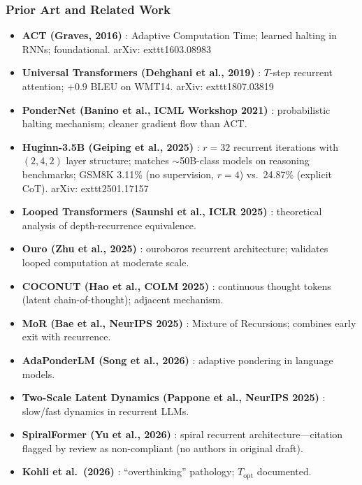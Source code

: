 \documentclass[11pt]{article}
\begin{document}
\subsubsection*{Prior Art and Related Work}
\begin{itemize}
  \item \textbf{ACT (Graves, 2016)} \cite{Graves2016}: Adaptive Computation Time; learned halting in RNNs; foundational.
    arXiv:	exttt{1603.08983}

  \item \textbf{Universal Transformers (Dehghani et al., 2019)} \cite{DehghaniEtAl2019}: $T$-step recurrent attention; $+0.9$ BLEU on WMT14.
    arXiv:	exttt{1807.03819}

  \item \textbf{PonderNet (Banino et al., ICML Workshop 2021)} \cite{BaninoEtAl2021}: probabilistic halting mechanism; cleaner gradient flow than ACT.

  \item \textbf{Huginn-3.5B (Geiping et al., 2025)} \cite{GeipingEtAl2025}: $r=32$ recurrent iterations with $(2,4,2)$ layer structure; matches $\sim$50B-class models on reasoning benchmarks; GSM8K 3.11\% (no supervision, $r=4$) vs.\ 24.87\% (explicit CoT).
    arXiv:	exttt{2501.17157}

  \item \textbf{Looped Transformers (Saunshi et al., ICLR 2025)} \cite{SaunshiEtAl2025}: theoretical analysis of depth-recurrence equivalence.

  \item \textbf{Ouro (Zhu et al., 2025)} \cite{ZhuEtAl2025Ouro}: ouroboros recurrent architecture; validates looped computation at moderate scale.

  \item \textbf{COCONUT (Hao et al., COLM 2025)} \cite{HaoEtAl2025}: continuous thought tokens (latent chain-of-thought); adjacent mechanism.

  \item \textbf{MoR (Bae et al., NeurIPS 2025)} \cite{BaeEtAl2025}: Mixture of Recursions; combines early exit with recurrence.

  \item \textbf{AdaPonderLM (Song et al., 2026)} \cite{SongEtAl2026}: adaptive pondering in language models.

  \item \textbf{Two-Scale Latent Dynamics (Pappone et al., NeurIPS 2025)} \cite{PapponeEtAl2025}: slow/fast dynamics in recurrent LLMs.

  \item \textbf{SpiralFormer (Yu et al., 2026)} \cite{YuEtAl2026}: spiral recurrent architecture---citation flagged by review as non-compliant (no authors in original draft).

  \item \textbf{Kohli et al.\ (2026)} \cite{KohliEtAl2026}: ``overthinking'' pathology; $T_\text{opt}$ documented.
\end{itemize}
\end{document}
